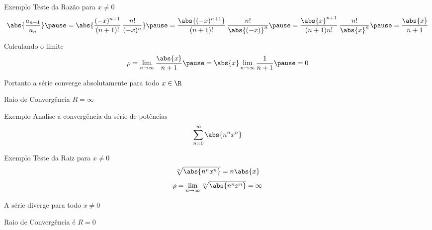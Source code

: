 \begin{frame}{Exemplo \theexemplo}
  Teste da Razão para \(x \neq 0\)
  \pause
  \[
    \abs{\frac{a_{n+1}}{a_n}}                                \pause =
    \abs{\frac{(-x)^{n+1}}{(n+1)!}\,\frac{n!}{(-x)^n}}       \pause =
    \frac{\abs{(-x)^{n+1}}}{(n+1)!}\,\frac{n!}{\abs{(-x)}^n} \pause =
    \frac{\abs{x}^{n+1}}{(n+1)n!}\,\frac{n!}{\abs{x}^n}      \pause =
    \frac{\abs{x}}{n+1}
  \]

  \pause
  Calculando o limite
  \[
    \rho
    = \lim_{n\to\infty} \frac{\abs{x}}{n+1}
    \pause
    = \abs{x} \lim_{n\to\infty} \frac{1}{n+1}
    \pause
    = 0
  \]

  \pause
  Portanto a série converge absolutamente para todo \(x\in\R\)

  \pause
  \vspace{0.5\baselineskip}
  Raio de Convergência \(R = \infty\)
\end{frame}

\addtocounter{exemplo}{1}
\begin{frame}{Exemplo \theexemplo}
  Analise a convergência da série de potências
  \[
    \sum_{n=0}^\infty \abs{n^n x^n}
  \]
\end{frame}

\begin{frame}{Exemplo \theexemplo}
  Teste da Raiz para \(x\neq 0\)
  \pause
  \[
    \sqrt[n]{\abs{n^nx^n}} =
    n\abs{x}
  \]
  \pause
  \vspace{-\baselineskip}
  \[
    \rho = \lim_{n\to\infty} \sqrt[n]{\abs{n^nx^n}} = \infty
  \]

  \pause
  \vspace{0.7\baselineskip}
  A série diverge para todo \(x\neq 0\)

  \pause
  \vspace{0.5\baselineskip}
  Raio de Convergência é $R=0$
\end{frame}

\begin{frame}{\contentsname}
  \tableofcontents
\end{frame}


